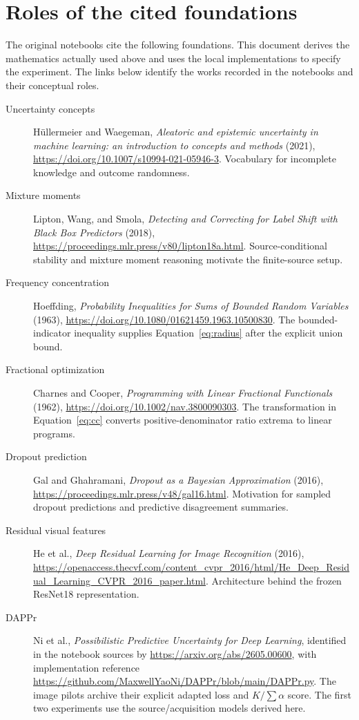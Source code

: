 \documentclass[11pt,a4paper]{report}
\begin{document}
\section{Roles of the cited foundations}
The original notebooks cite the following foundations. This document derives the mathematics actually used above and uses the local implementations to specify the experiment. The links below identify the works recorded in the notebooks and their conceptual roles.
\begin{description}
\item[Uncertainty concepts] H\"ullermeier and Waegeman, \emph{Aleatoric and epistemic uncertainty in machine learning: an introduction to concepts and methods} (2021), \url{https://doi.org/10.1007/s10994-021-05946-3}. Vocabulary for incomplete knowledge and outcome randomness.
\item[Mixture moments] Lipton, Wang, and Smola, \emph{Detecting and Correcting for Label Shift with Black Box Predictors} (2018), \url{https://proceedings.mlr.press/v80/lipton18a.html}. Source-conditional stability and mixture moment reasoning motivate the finite-source setup.
\item[Frequency concentration] Hoeffding, \emph{Probability Inequalities for Sums of Bounded Random Variables} (1963), \url{https://doi.org/10.1080/01621459.1963.10500830}. The bounded-indicator inequality supplies Equation~\eqref{eq:radius} after the explicit union bound.
\item[Fractional optimization] Charnes and Cooper, \emph{Programming with Linear Fractional Functionals} (1962), \url{https://doi.org/10.1002/nav.3800090303}. The transformation in Equation~\eqref{eq:cc} converts positive-denominator ratio extrema to linear programs.
\item[Dropout prediction] Gal and Ghahramani, \emph{Dropout as a Bayesian Approximation} (2016), \url{https://proceedings.mlr.press/v48/gal16.html}. Motivation for sampled dropout predictions and predictive disagreement summaries.
\item[Residual visual features] He et al., \emph{Deep Residual Learning for Image Recognition} (2016), \url{https://openaccess.thecvf.com/content_cvpr_2016/html/He_Deep_Residual_Learning_CVPR_2016_paper.html}. Architecture behind the frozen ResNet18 representation.
\item[DAPPr] Ni et al., \emph{Possibilistic Predictive Uncertainty for Deep Learning}, identified in the notebook sources by \url{https://arxiv.org/abs/2605.00600}, with implementation reference \url{https://github.com/MaxwellYaoNi/DAPPr/blob/main/DAPPr.py}. The image pilots archive their explicit adapted loss and $K/\sum\alpha$ score. The first two experiments use the source/acquisition models derived here.

\end{description}
\end{document}
